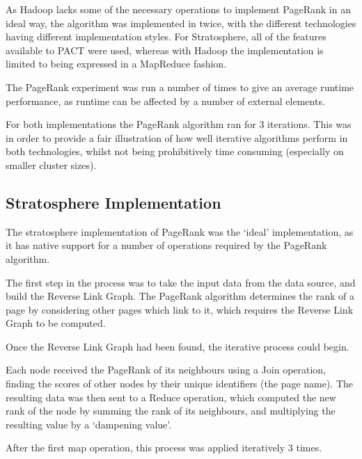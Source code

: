 As Hadoop lacks some of the necessary operations to implement PageRank in an ideal way, the algorithm was implemented in twice, with the different technologies having different implementation styles. For Stratosphere, all of the features available to PACT were used, whereas with Hadoop the implementation is limited to being expressed in a MapReduce fashion.

The PageRank experiment was run a number of times to give an average runtime performance, as runtime can be affected by a number of external elements. 

For both implementations the PageRank algorithm ran for 3 iterations. This was in order to provide a fair illustration of how well iterative algorithms perform in both technologies, whilst not being prohibitively time consuming (especially on smaller cluster sizes).

\subsection{Stratosphere Implementation}
The stratosphere implementation of PageRank was the `ideal' implementation, as it has native support for a number of operations required by the PageRank algorithm. 

The first step in the process was to take the input data from the data source, and build the Reverse Link Graph. The PageRank algorithm determines the rank of a page by considering other pages which link to it, which requires the Reverse Link Graph to be computed. 

Once the Reverse Link Graph had been found, the iterative process could begin.

Each node received the PageRank of its neighbours using a Join operation, finding the scores of other nodes by their unique identifiers (the page name). The resulting data was then sent to a Reduce operation, which computed the new rank of the node by summing the rank of its neighbours, and multiplying the resulting value by a `dampening value'. 

After the first map operation, this process was applied iteratively 3 times. 

